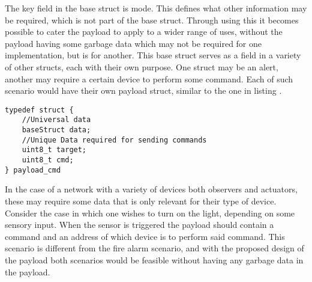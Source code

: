 The key field in the base struct is mode.
This defines what other information may be required, which is not part of the base struct.
Through using this it becomes possible to cater the payload to apply to a wider range of uses, without the payload having some garbage data which may not be required for one implementation, but is for another.
This base struct serves as a field in a variety of other structs, each with their own purpose.
One struct may be an alert, another may require a certain device to perform some command.
Each of such scenario would have their own payload struct, similar to the one in listing .

\bigskip \noindent
\lstset{style=customc}
\begin{lstlisting}[caption={A possible way a struct for designating commands could look in the payload},frame=tlrb,label={cmdStruct},numbers=none]
typedef struct { 
    //Universal data
    baseStruct data;
    //Unique Data required for sending commands
    uint8_t target;
    uint8_t cmd;
} payload_cmd
\end{lstlisting}
\bigskip \noindent

In the case of a network with a variety of devices both observers and actuators, these may require some data that is only relevant for their type of device.
Consider the case in which one wishes to turn on the light, depending on some sensory input.
When the sensor is triggered the payload should contain a command and an address of which device is to perform said command.
This scenario is different from the fire alarm scenario, and with the proposed design of the payload both scenarios would be feasible without having any garbage data in the payload.

